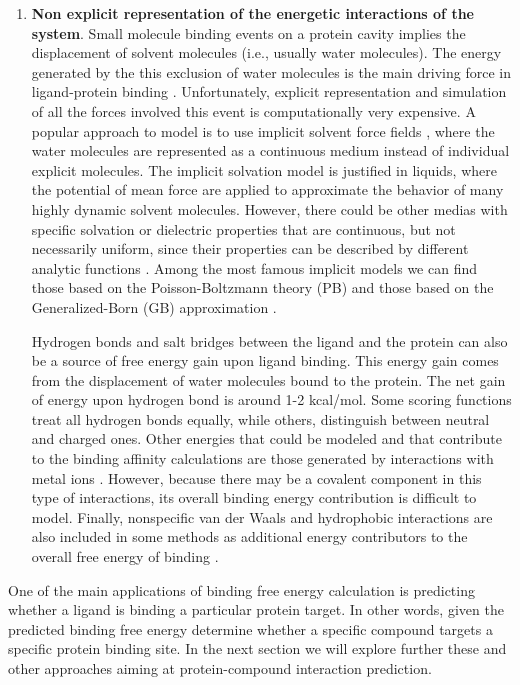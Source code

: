\documentclass[11pt, b5paper,twoside]{tesi_upf}
\begin{document}
\begin{enumerate}
\item \textbf{Non explicit representation of the energetic interactions of the system}. Small molecule binding events on a protein cavity implies the displacement of solvent molecules (i.e., usually water molecules). The energy generated by the this exclusion of water molecules is the main driving force in ligand-protein binding \cite{Michel2009a}. Unfortunately, explicit representation and simulation of all the forces involved this event is computationally very expensive. A popular approach to model is to use implicit solvent force fields \cite{Ravindranathan2011, Michel2006, Liu2009}, where the water molecules are represented as a continuous medium instead of individual explicit molecules. The implicit solvation model is justified in liquids, where the potential of mean force are applied to approximate the behavior of many highly dynamic solvent molecules. However, there could be other medias with specific solvation or dielectric properties that are continuous, but not necessarily uniform, since their properties can be described by different analytic functions \cite{Lu2007}. Among the most famous implicit models we can find those based on the Poisson-Boltzmann theory (PB) \cite{Sharp1990} and those based on the Generalized-Born (GB) approximation \cite{Bashford2000}. 
\par Hydrogen bonds and salt bridges between the ligand and the protein can also be a source of free energy gain upon ligand binding. This energy gain comes from the displacement of water molecules bound to the protein. The net gain of energy upon hydrogen bond is around 1-2 kcal/mol. Some scoring functions treat all hydrogen bonds equally, while others, distinguish between neutral and charged ones. Other energies that could be modeled and that contribute to the binding affinity calculations are those generated by interactions with metal ions \cite{Friesner2004}. However, because there may be a covalent component in this type of interactions, its overall binding energy contribution is difficult to model. Finally, nonspecific van der Waals and hydrophobic interactions are also included in some methods as additional energy contributors to the overall free energy of binding \cite{Steffen2010}. 
\end{enumerate}

\par One of the main applications of binding free energy calculation is predicting whether a ligand is binding a particular protein target. In other words, given the predicted binding free energy determine whether a specific compound targets a specific protein binding site. In the next section we will explore further these and other approaches aiming at protein-compound interaction prediction.  
\end{document}
